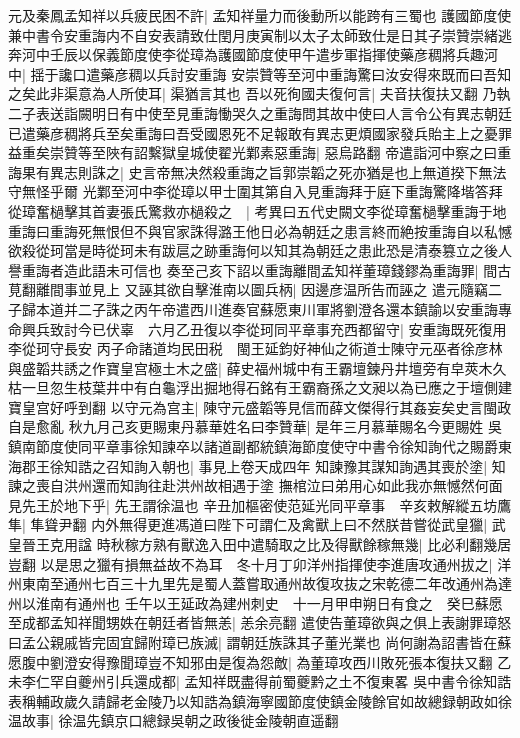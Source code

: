 元及秦鳳孟知祥以兵疲民困不許|{
	孟知祥量力而後動所以能跨有三蜀也}
護國節度使兼中書令安重誨内不自安表請致仕閏月庚寅制以太子太師致仕是日其子崇贊崇緒逃奔河中壬辰以保義節度使李從璋為護國節度使甲午遣步軍指揮使藥彦稠將兵趣河中|{
	揺于讒口遣藥彦稠以兵討安重誨}
安崇贊等至河中重誨驚曰汝安得來既而曰吾知之矣此非渠意為人所使耳|{
	渠猶言其也}
吾以死徇國夫復何言|{
	夫音扶復扶又翻}
乃執二子表送詣闕明日有中使至見重誨慟哭久之重誨問其故中使曰人言令公有異志朝廷已遣藥彦稠將兵至矣重誨曰吾受國恩死不足報敢有異志更煩國家發兵貽主上之憂罪益重矣崇贊等至陜有詔繫獄皇城使翟光鄴素惡重誨|{
	惡烏路翻}
帝遣詣河中察之曰重誨果有異志則誅之|{
	史言帝無决然殺重誨之旨郭崇韜之死亦猶是也上無道揆下無法守無怪乎爾}
光鄴至河中李從璋以甲士圍其第自入見重誨拜于庭下重誨驚降堦答拜從璋奮檛擊其首妻張氏驚救亦檛殺之　|{
	考異曰五代史闕文李從璋奮檛擊重誨于地重誨曰重誨死無恨但不與官家誅得潞王他日必為朝廷之患言終而絶按重誨自以私憾欲殺從珂當是時從珂未有跋扈之跡重誨何以知其為朝廷之患此恐是清泰篡立之後人譽重誨者造此語未可信也}
奏至己亥下詔以重誨離間孟知祥董璋錢鏐為重誨罪|{
	間古莧翻離間事並見上}
又誣其欲自擊淮南以圖兵柄|{
	因邊彦温所告而誣之}
遣元隨竊二子歸本道并二子誅之丙午帝遣西川進奏官蘇愿東川軍將劉澄各還本鎮諭以安重誨專命興兵致討今已伏辜　六月乙丑復以李從珂同平章事充西都留守|{
	安重誨既死復用李從珂守長安}
丙子命諸道均民田税　閩王延鈞好神仙之術道士陳守元巫者徐彦林與盛韜共誘之作寶皇宫極土木之盛|{
	薛史福州城中有王霸壇鍊丹井壇旁有皁莢木久枯一旦忽生枝葉井中有白龜浮出掘地得石銘有王霸裔孫之文昶以為已應之于壇側建寶皇宫好呼到翻}
以守元為宫主|{
	陳守元盛韜等見信而薛文傑得行其姦妄矣史言閩政自是愈亂}
秋九月己亥更賜東丹慕華姓名曰李贊華|{
	是年三月慕華賜名今更賜姓}
吳鎮南節度使同平章事徐知諫卒以諸道副都統鎮海節度使守中書令徐知詢代之賜爵東海郡王徐知誥之召知詢入朝也|{
	事見上卷天成四年}
知諫豫其謀知詢遇其喪於塗|{
	知諫之喪自洪州還而知詢往赴洪州故相遇于塗}
撫棺泣曰弟用心如此我亦無憾然何面見先王於地下乎|{
	先王謂徐温也}
辛丑加樞密使范延光同平章事　辛亥敕解縱五坊鷹隼|{
	隼聳尹翻}
内外無得更進馮道曰陛下可謂仁及禽獸上曰不然朕昔嘗從武皇獵|{
	武皇晉王克用諡}
時秋稼方熟有獸逸入田中遣騎取之比及得獸餘稼無幾|{
	比必利翻幾居豈翻}
以是思之獵有損無益故不為耳　冬十月丁卯洋州指揮使李進唐攻通州拔之|{
	洋州東南至通州七百三十九里先是蜀人蓋嘗取通州故復攻抜之宋乾德二年改通州為達州以淮南有通州也}
壬午以王延政為建州刺史　十一月甲申朔日有食之　癸巳蘇愿至成都孟知祥聞甥妷在朝廷者皆無恙|{
	恙余亮翻}
遣使告董璋欲與之俱上表謝罪璋怒曰孟公親戚皆完固宜歸附璋已族滅|{
	謂朝廷族誅其子董光業也}
尚何謝為詔書皆在蘇愿腹中劉澄安得豫聞璋豈不知邪由是復為怨敵|{
	為董璋攻西川敗死張本復扶又翻}
乙未李仁罕自夔州引兵還成都|{
	孟知祥既盡得前蜀夔黔之土不復東畧}
吳中書令徐知誥表稱輔政歲久請歸老金陵乃以知誥為鎮海寧國節度使鎮金陵餘官如故總録朝政如徐温故事|{
	徐温先鎮京口總録吳朝之政後徙金陵朝直遥翻}
